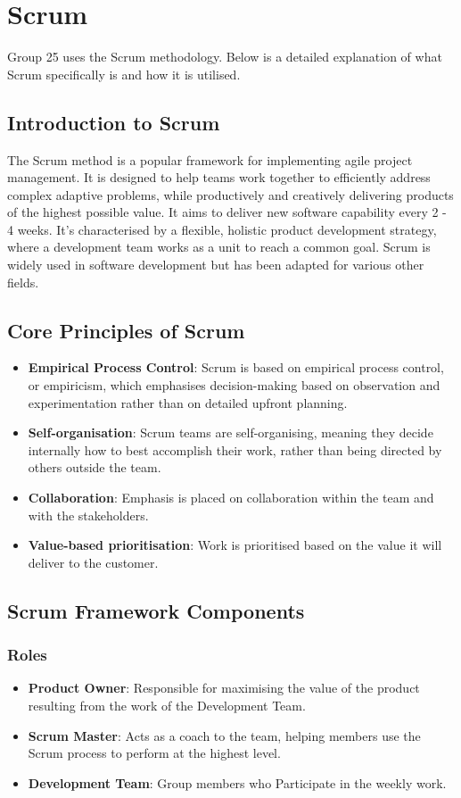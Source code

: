 \documentclass[sigconf,nonacm]{acmart}
\begin{document}
\section{Scrum}
Group 25 uses the Scrum methodology. Below is a detailed explanation of what Scrum specifically is and how it is utilised.

\subsection{Introduction to Scrum}
The Scrum method is a popular framework for implementing agile project management. It is designed to help teams work together to efficiently address complex adaptive problems, while productively and creatively delivering products of the highest possible value. It aims to deliver new software capability every 2 - 4 weeks. It's characterised by a flexible, holistic product development strategy, where a development team works as a unit to reach a common goal. Scrum is widely used in software development but has been adapted for various other fields.

\subsection{Core Principles of Scrum}
\begin{itemize}
    \item \textbf{Empirical Process Control}: Scrum is based on empirical process control, or empiricism, which emphasises decision-making based on observation and experimentation rather than on detailed upfront planning.
    \item \textbf{Self-organisation}: Scrum teams are self-organising, meaning they decide internally how to best accomplish their work, rather than being directed by others outside the team.
    \item \textbf{Collaboration}: Emphasis is placed on collaboration within the team and with the stakeholders.
    \item \textbf{Value-based prioritisation}: Work is prioritised based on the value it will deliver to the customer.
\end{itemize}

\subsection{Scrum Framework Components}
\subsubsection{Roles}
\begin{itemize}
    \item \textbf{Product Owner}: Responsible for maximising the value of the product resulting from the work of the Development Team.
    \item \textbf{Scrum Master}: Acts as a coach to the team, helping members use the Scrum process to perform at the highest level.
    \item \textbf{Development Team}: Group members who Participate in the weekly work.
\end{itemize}
\end{document}
